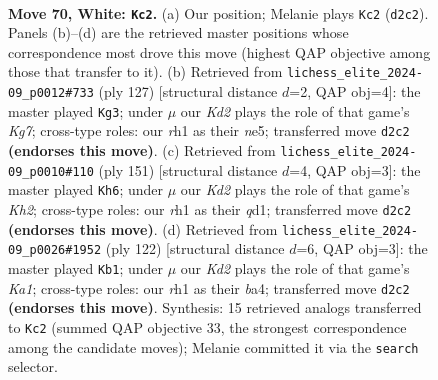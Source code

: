 \documentclass[11pt]{article}
\begin{document}
\clearpage

\begin{figure}[p]\centering
\begin{subfigure}{0.46\textwidth}\centering
\resizebox{\linewidth}{!}{%
\newchessgame
\chessboard[
  setfen={8/2k5/2p5/3p4/p7/8/3K4/7r w - - 2 70},
  showmover=false,
  pgfstyle=straightmove, color=movearrow, markmove={d2-c2}
]}
\caption{}
\end{subfigure}\hfill
\begin{subfigure}{0.46\textwidth}\centering
\resizebox{\linewidth}{!}{%
\newchessgame
\chessboard[
  setfen={8/8/8/4N3/P7/1P2P3/1K4k1/8 b - - 1 64},
  showmover=false,
  pgfstyle=straightmove, color=movearrow, markmove={g2-g3}
]}
\caption{}
\end{subfigure}
\\[4pt]
\begin{subfigure}{0.46\textwidth}\centering
\resizebox{\linewidth}{!}{%
\newchessgame
\chessboard[
  setfen={8/7k/8/8/5P2/6PK/8/3Q4 b - - 0 76},
  showmover=false,
  pgfstyle=straightmove, color=movearrow, markmove={h7-h6}
]}
\caption{}
\end{subfigure}\hfill
\begin{subfigure}{0.46\textwidth}\centering
\resizebox{\linewidth}{!}{%
\newchessgame
\chessboard[
  setfen={8/8/8/8/bpk5/p7/8/K7 w - - 4 62},
  showmover=false,
  pgfstyle=straightmove, color=movearrow, markmove={a1-b1}
]}
\caption{}
\end{subfigure}
\caption{\textbf{Move 70, White: \texttt{Kc2}.} (a) Our position; Melanie plays \texttt{Kc2} (\texttt{d2c2}). Panels (b)--(d) are the retrieved master positions whose correspondence most drove this move (highest QAP objective among those that transfer to it). (b) Retrieved from \texttt{lichess\_elite\_2024-09\_p0012\#733} (ply 127) [structural distance $d$=2, QAP obj=4]: the master played \texttt{Kg3}; under $\mu$ our \emph{Kd2} plays the role of that game's \emph{Kg7}; cross-type roles: our \emph{r}h1 as their \emph{n}e5; transferred move \texttt{d2c2} \textbf{(endorses this move)}. (c) Retrieved from \texttt{lichess\_elite\_2024-09\_p0010\#110} (ply 151) [structural distance $d$=4, QAP obj=3]: the master played \texttt{Kh6}; under $\mu$ our \emph{Kd2} plays the role of that game's \emph{Kh2}; cross-type roles: our \emph{r}h1 as their \emph{q}d1; transferred move \texttt{d2c2} \textbf{(endorses this move)}. (d) Retrieved from \texttt{lichess\_elite\_2024-09\_p0026\#1952} (ply 122) [structural distance $d$=6, QAP obj=3]: the master played \texttt{Kb1}; under $\mu$ our \emph{Kd2} plays the role of that game's \emph{Ka1}; cross-type roles: our \emph{r}h1 as their \emph{b}a4; transferred move \texttt{d2c2} \textbf{(endorses this move)}. Synthesis: 15 retrieved analogs transferred to \texttt{Kc2} (summed QAP objective 33, the strongest correspondence among the candidate moves); Melanie committed it via the \texttt{search} selector.}
\label{fig:thought-m138}
\end{figure}
\end{document}
